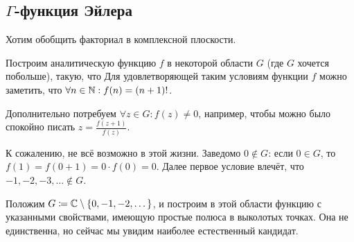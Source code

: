 \documentclass[a4paper]{report}
\begin{document}
    \subsection{$\Gamma$-функция Эйлера}
    \label{gamma}
    Хотим обобщить факториал в комплексной плоскости.

    Построим аналитическую функцию $f$ в некоторой области $G$ (где $G$ хочется побольше), такую, что
    Для удовлетворяющей таким условиям функции $f$ можно заметить, что $\forall n \in \mathbb{N}: f(n) = (n + 1)!$.

    Дополнительно потребуем $\forall z \in G: f(z) \ne 0$, например, чтобы можно было спокойно писать $z = \frac{f(z + 1)}{f(z)}$.

    К сожалению, не всё возможно в этой жизни.
    Заведомо $0 \notin G$: если $0 \in G$, то $f(1) = f(0 + 1) = 0 \cdot f(0) = 0$.
    Далее первое условие влечёт, что $-1, -2, -3, \dots \notin G$.

    Положим $G \coloneqq \mathbb{C} \setminus \{0, -1, -2, \dots\}$, и построим в этой области функцию с указанными свойствами, имеющую простые полюса в выколотых точках.
    Она не единственна, но сейчас мы увидим наиболее естественный кандидат.
\end{document}

